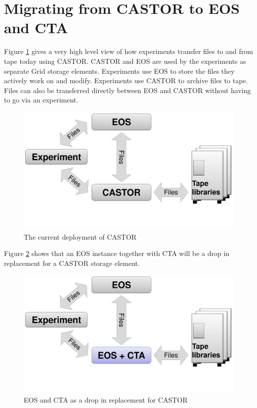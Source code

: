 \documentclass[a4paper]{jpconf}
\begin{document}
\pagebreak
\section{Migrating from CASTOR to EOS and CTA} \label{migrating}

Figure \ref{current} gives a very high level view of how experiments transfer
files to and from tape today using CASTOR.  CASTOR and EOS are used by the
experiments as separate Grid storage elements.  Experiments use EOS to store
the files they actively work on and modify.  Experiments use CASTOR to archive
files to tape.  Files can also be transferred directly between EOS and CASTOR
without having to go via an experiment.

\begin{figure}[h]
\centering
\includegraphics[scale=0.18, trim=0mm 60mm 0mm 0mm, clip]{CTA_current_deployment.pdf}
\caption{\label{current}The current deployment of CASTOR}
\end{figure}

Figure \ref{replacement} shows that an EOS instance together with CTA will be
a drop in replacement for a CASTOR storage element.

\begin{figure}[h]
\centering
\includegraphics[scale=0.18, trim=0mm 60mm 0mm 0mm, clip]{CTA_drop_in_replacement_deployment.pdf}
\caption{\label{replacement}EOS and CTA as a drop in replacement for CASTOR}
\end{figure}
\end{document}

